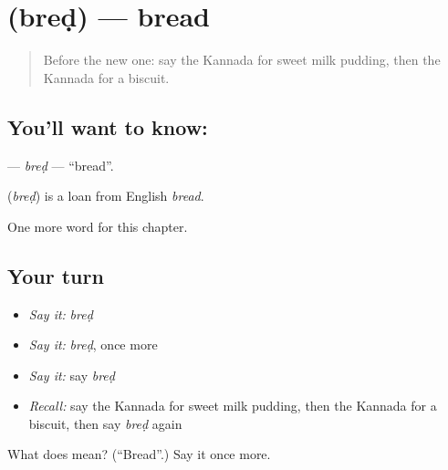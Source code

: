 \section[\texorpdfstring{\kn{ಬ್ರೆಡ್} (breḍ)}{ಬ್ರೆಡ್ (breḍ)}]{ (breḍ) — bread}

\label{lesson:KA-C258-bred}



\begin{quote}
Before the new one: say the Kannada for sweet milk pudding, then the Kannada for a biscuit.
\end{quote}

\subsection*{You'll want to know: }
\textbf{} — \emph{breḍ} — \textquotedblleft{}bread\textquotedblright{}.

\begin{cousinweb}
\textbf{} (\emph{breḍ}) is a loan from English \emph{bread}.
\end{cousinweb}

\begin{grammarlens}[title={What you've built}]
One more word for this chapter.
\end{grammarlens}

\subsection*{Your turn}
\begin{itemize}
\raggedright
  \item \emph{Say it:} \emph{breḍ}
  \item \emph{Say it:} \emph{breḍ}, once more
  \item \emph{Say it:} say \emph{breḍ}
  \item \emph{Recall:} say the Kannada for sweet milk pudding, then the Kannada for a biscuit, then say \emph{breḍ} again
\end{itemize}

\begin{tcolorbox}[breakable,colback=teal!4,colframe=teal!35!black,title={Before you move on}]
What does  mean? (\textquotedblleft{}Bread\textquotedblright{}.) Say it once more.
\end{tcolorbox}
